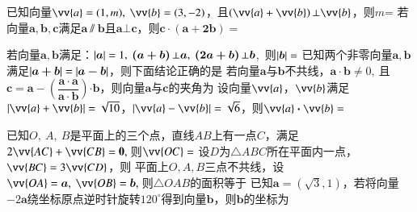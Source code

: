 \documentclass{BHCexam}
\newcommand{\xl}[2]{\vv{#1}\bm\cdot\vv{#2}}
\begin{document}
\fubiaoti{}
\maketitle
\begin{questions}

\qs
已知向量$ \vv{a}=(1,m),~\vv{b}=(3,-2) $，且$\left(\vv{a}+\vv{b}\right)\bot \vv{b} $，则$m$=\xx
{}
\qs 若向量$ \bm{a,b,c} $满足$ \bm{a}\sslash\bm{b} $且$ \bm{a}\bot\bm{c} $，则$ \bm{c\cdot\left(a+2b\right)} =$\xx
{}

\qs 若向量$ \bm{a,b} $满足：$ \left|\bm{a}\right|=1,~\bm{\left(a+b\right)}\bot \bm{a},~\bm{\left(2a+b\right)}\bot \bm{b} $,~则$ \left|\bm{b}\right|= $\xx
{}
\qs 已知两个非零向量$\bm{ a,b}$满足$ \left|\bm{a+b}\right|=\left|\bm{a-b}\right| $，则下面结论正确的是\xx
{}
\qs 若向量$ \bm{a} $与$ \bm{b} $不共线，$ \bm{a}\cdot \bm{b}\ne 0,~ $且$\bm{c}=\bm{a}-\left(\dfrac{\bm{a\cdot a}}{\bm{a\cdot b}}\right)\bm{\cdot b} $，则向量$ \bm{a} $与$ \bm{c} $的夹角为\xx
{}
\qs
设向量$\vv{a}$，$\vv{b}$满足$\left|\vv{a}+\vv{b}\right|=\sqrt{10}$，$\left|\vv{a}-\vv{b}\right|=\sqrt{6}$，则$\xl{a}{b}=$\xx
{}


\qs 已知$ O,~A,~B $是平面上的三个点，直线$ AB $上有一点$ C $，满足$ 2\vv{AC}+\vv{CB}=\mathbf{0}, ~$则$ \vv{OC}= $\xx
{}
\qs 设$ D $为$\triangle ABC$所在平面内一点，$ \vv{BC}=3\vv{CD} $，则\xx
{}
\qs 平面上$ O,A,B $三点不共线，设$ \vv{OA}=\bm{a},~\vv{OB}=\bm{b},~ $则$ \triangle OAB $的面积等于\xx
{}
\qs 已知$ \bm{a}=(\sqrt{3},1) $，若将向量$ -2\bm{a} $绕坐标原点逆时针旋转$ 120^{\circ} $得到向量$ \bm{b} $，则$ \bm{b} $的坐标为\xx
{}


\end{questions}
\end{document}
